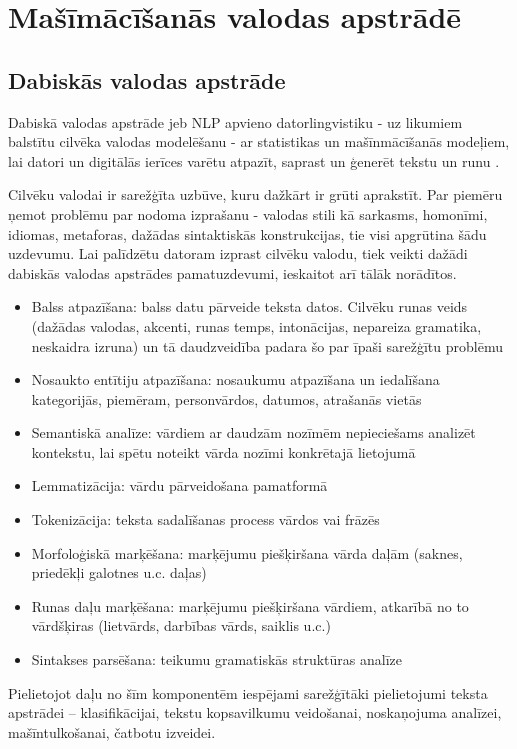 \chapter{Mašīmācīšanās valodas apstrādē}
\section{Dabiskās valodas apstrāde}
Dabiskā valodas apstrāde jeb NLP apvieno datorlingvistiku - uz likumiem balstītu cilvēka valodas modelēšanu - ar statistikas un mašīnmācīšanās modeļiem, lai datori un digitālās ierīces varētu atpazīt, saprast un ģenerēt tekstu un runu \cite{ibmMachineLearning}.

Cilvēku valodai ir sarežģīta uzbūve, kuru dažkārt ir grūti aprakstīt. Par piemēru ņemot problēmu par nodoma izprašanu - valodas stili kā sarkasms, homonīmi, idiomas, metaforas, dažādas sintaktiskās konstrukcijas, tie visi apgrūtina šādu uzdevumu. Lai palīdzētu datoram izprast cilvēku valodu, tiek veikti dažādi dabiskās valodas apstrādes pamatuzdevumi, ieskaitot arī tālāk norādītos.
\begin{itemize}
\item Balss atpazīšana: balss datu pārveide teksta datos. Cilvēku runas veids (dažādas valodas, akcenti, runas temps, intonācijas, nepareiza gramatika, neskaidra izruna) un tā daudzveidība padara šo par īpaši sarežģītu problēmu
\item Nosaukto entītiju atpazīšana: nosaukumu atpazīšana un iedalīšana kategorijās, piemēram, personvārdos, datumos, atrašanās vietās
\item Semantiskā analīze: vārdiem ar daudzām nozīmēm nepieciešams analizēt kontekstu, lai spētu noteikt vārda nozīmi konkrētajā lietojumā
\item Lemmatizācija: vārdu pārveidošana pamatformā
\item Tokenizācija: teksta sadalīšanas process vārdos vai frāzēs
\item Morfoloģiskā marķēšana: marķējumu piešķiršana vārda daļām (saknes, priedēkļi galotnes u.c. daļas)
\item Runas daļu marķēšana: marķējumu piešķiršana vārdiem, atkarībā no to vārdšķiras (lietvārds, darbības vārds, saiklis u.c.)
\item Sintakses parsēšana: teikumu gramatiskās struktūras analīze
\end{itemize}

Pielietojot daļu no šīm komponentēm iespējami sarežģītāki pielietojumi teksta apstrādei – klasifikācijai, tekstu kopsavilkumu veidošanai, noskaņojuma analīzei, mašīntulkošanai, čatbotu izveidei. 

